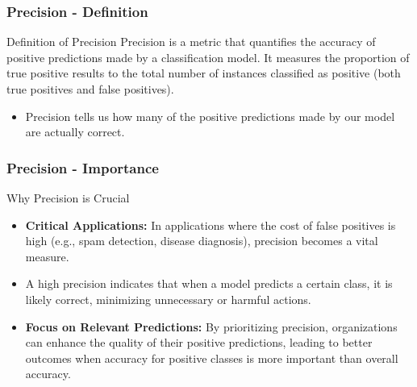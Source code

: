 \documentclass[aspectratio=169]{beamer}
\begin{document}
\begin{frame}[fragile]
    \frametitle{Precision - Definition}
    \begin{block}{Definition of Precision}
        Precision is a metric that quantifies the accuracy of positive predictions made by a classification model. It measures the proportion of true positive results to the total number of instances classified as positive (both true positives and false positives). 
        \begin{itemize}
            \item Precision tells us how many of the positive predictions made by our model are actually correct.
        \end{itemize}
    \end{block}
\end{frame}

\begin{frame}[fragile]
    \frametitle{Precision - Importance}
    \begin{block}{Why Precision is Crucial}
        \begin{itemize}
            \item \textbf{Critical Applications:} In applications where the cost of false positives is high (e.g., spam detection, disease diagnosis), precision becomes a vital measure.
            \item A high precision indicates that when a model predicts a certain class, it is likely correct, minimizing unnecessary or harmful actions.
            \item \textbf{Focus on Relevant Predictions:} By prioritizing precision, organizations can enhance the quality of their positive predictions, leading to better outcomes when accuracy for positive classes is more important than overall accuracy.
        \end{itemize}
    \end{block}
\end{frame}
\end{document}
